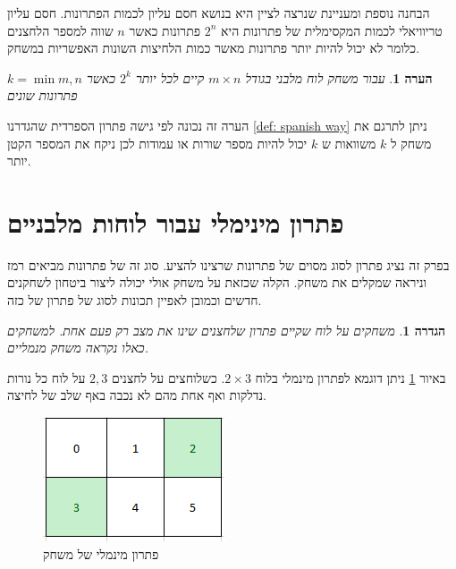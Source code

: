 \documentclass[12pt,leqno]{article}
\newtheorem{definition}{הגדרה}[section]
\newtheorem{comm}{הערה}[section]
\begin{document}
הבחנה נוספת ומעניינת שנרצה לציין היא בנושא חסם עליון לכמות הפתרונות.
חסם עליון טריוויאלי לכמות המקסימלית של פתרונות היא 
$2^n$
פתרונות כאשר
$n$
שווה למספר הלחצנים כלומר לא יכול להיות יותר פתרונות מאשר כמות הלחיצות השונות האפשריות במשחק.

\begin{comm}
    עבור משחק לוח מלבני
    בגודל 
    $m \times n$
    קיים לכל יותר 
    $2^k$
    כאשר 
    $k = \min{m,n}$
    פתרונות שונים
\end{comm}
הערה זה נכונה לפי גישה פתרון הספרדית
שהגדרנו
\ref{def: spanish way}
ניתן לתרגם את משחק ל
$k$
משוואות 
ש
$k$
יכול להיות מספר שורות או עמודות 
לכן ניקח את המספר הקטן יותר.


\section{פתרון מינימלי עבור לוחות מלבניים}
בפרק זה נציג פתרון לסוג מסוים של פתרונות שרצינו להציע. סוג זה של פתרונות 
מביאים רמז וניראה שמקלים את משחק. הקלה שכזאת על משחק אולי 
יכולה ליצור ביטחון לשחקנים חדשים וכמובן לאפיין תכונות לסוג של פתרון של כזה.

\begin{definition}
משחקים על לוח שקיים פתרון שלחצנים 
שינו את מצב רק פעם אחת.
למשחקים כאלו נקראה משחק מנמליים.
\end{definition}

באיור 
\ref{fig: min sol 2x3}
ניתן דוגמא לפתרון מינמלי 
בלוח 
$2 \times 3$.
כשלוחצים על לחצנים 
$2, 3$
על לוח כל נורות נדלקות ואף 
אחת מהם לא נכבה באף שלב של לחיצה.

\begin{figure}[ht]
    \caption{פתרון מינמלי של משחק}
    \label{fig: min sol 2x3}
    \centering
    \includegraphics[width=.7\textwidth,height=.7\textheight,keepaspectratio]{images/min_sol_2x3.PNG}
\end{figure}
\end{document}
